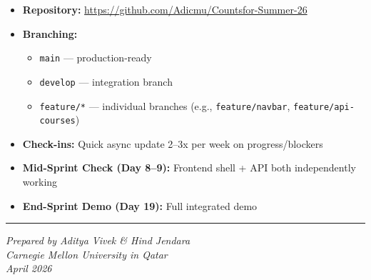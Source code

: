 \documentclass[11pt]{article}
\begin{document}
\begin{itemize}
    \item \textbf{Repository:} \url{https://github.com/Adicmu/Countsfor-Summer-26}
    \item \textbf{Branching:}
    \begin{itemize}
        \item \texttt{main} — production-ready
        \item \texttt{develop} — integration branch
        \item \texttt{feature/*} — individual branches (e.g., \texttt{feature/navbar}, \texttt{feature/api-courses})
    \end{itemize}
    \item \textbf{Check-ins:} Quick async update 2--3x per week on progress/blockers
    \item \textbf{Mid-Sprint Check (Day 8--9):} Frontend shell + API both independently working
    \item \textbf{End-Sprint Demo (Day 19):} Full integrated demo
\end{itemize}

\vspace{1cm}
\noindent\rule{\textwidth}{0.4pt}
\begin{center}
\textit{Prepared by Aditya Vivek \& Hind Jendara}\\
\textit{Carnegie Mellon University in Qatar}\\
\textit{April 2026}
\end{center}
\end{document}
